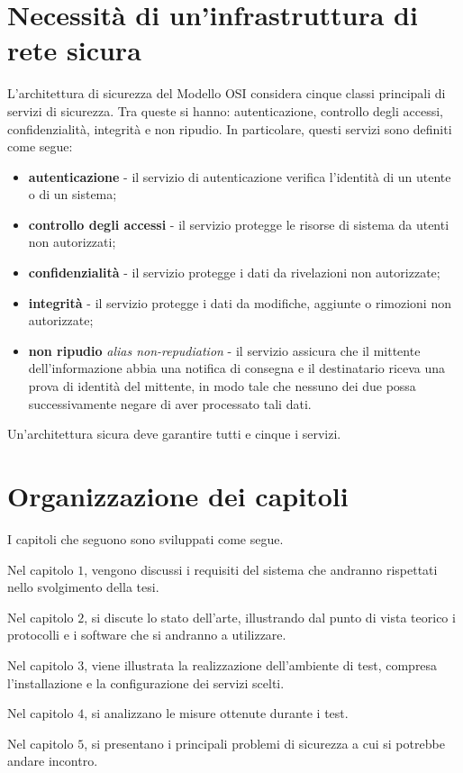 \section{Necessità di un'infrastruttura di rete sicura}
L'architettura di sicurezza del Modello OSI considera cinque classi principali di servizi di sicurezza. Tra queste si hanno: autenticazione, controllo degli accessi, confidenzialità, integrità e non ripudio.
In particolare, questi servizi sono definiti come segue:
\begin{itemize}
    \item \textbf{autenticazione} - il servizio di autenticazione verifica l'identità di un utente o di un sistema;
    \item \textbf{controllo degli accessi} - il servizio protegge le risorse di sistema da utenti non autorizzati;
    \item \textbf{confidenzialità} - il servizio protegge i dati da rivelazioni non autorizzate;
    \item \textbf{integrità} - il servizio protegge i dati da modifiche, aggiunte o rimozioni non autorizzate;
    \item \textbf{non ripudio} \emph{alias non-repudiation} - il servizio assicura che il mittente dell'informazione abbia una notifica di consegna e il destinatario riceva una prova di identità del mittente, in modo tale che nessuno dei due possa successivamente negare di aver processato tali dati.
\end{itemize}
Un'architettura sicura deve garantire tutti e cinque i servizi.

\section{Organizzazione dei capitoli}
I capitoli che seguono sono sviluppati come segue.

Nel capitolo $1$, vengono discussi i requisiti del sistema che andranno rispettati nello svolgimento della tesi.

Nel capitolo $2$, si discute lo stato dell'arte, illustrando dal punto di vista teorico i protocolli e i software che si andranno a utilizzare.

Nel capitolo $3$, viene illustrata la realizzazione dell'ambiente di test, compresa l'installazione e la configurazione dei servizi scelti.

Nel capitolo $4$, si analizzano le misure ottenute durante i test.

Nel capitolo $5$, si presentano i principali problemi di sicurezza a cui si potrebbe andare incontro.


